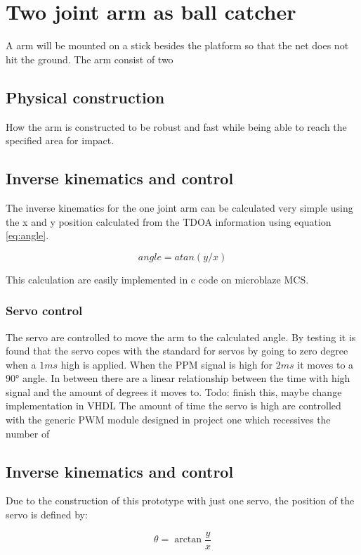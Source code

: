 \chapter{Two joint arm as ball catcher}
\label{catcherArm}
	A arm will be mounted on a stick besides the platform so that the net does not hit the ground. The arm consist of two

\section{Physical construction}
\label{armConstruction}
	How the arm is constructed to be robust and fast while being able to reach the specified area for impact.

\section{Inverse kinematics and control }
\label{kinematics}
The inverse kinematics for the one joint arm can be calculated very simple using the x and y position calculated from the TDOA information using equation \ref{eq:angle}.

\begin{equation}
	angle = atan(y/x)
	\label{eq:angle}
\end{equation}

This calculation are easily implemented in c code on microblaze MCS.

\subsection{Servo control}
The servo are controlled to move the arm to the calculated angle. By testing it is found that the servo copes with the standard for servos by going to zero degree when a $1\si{ms}$ high is applied. When the PPM signal is high for $2\si{ms}$ it moves to a $90\si{\degree}$ angle. In between there are a linear relationship between the time with high signal and the amount of degrees it moves to.
Todo: finish this, maybe change implementation in VHDL
The amount of time the servo is high are controlled with the generic PWM module designed in project one which recessives the number of



	\section{Inverse kinematics and control}
		Due to the construction of this prototype with just one servo, the position of the servo is defined by:

		$$\theta = \arctan\frac{y}{x}$$
